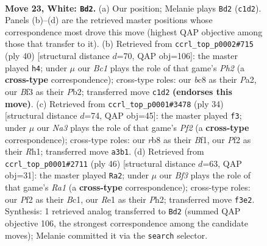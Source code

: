 \documentclass[11pt]{article}
\begin{document}
\clearpage

\begin{figure}[p]\centering
\begin{subfigure}{0.46\textwidth}\centering
\resizebox{\linewidth}{!}{%
\newchessgame
\chessboard[
  setfen={1rb2r2/p3np1k/1p2pnpp/2P5/1RP5/N3PB1P/P4PP1/2B1R1K1 w - - 4 23},
  showmover=false,
  pgfstyle=straightmove, color=movearrow, markmove={c1-d2}
]}
\caption{}
\end{subfigure}\hfill
\begin{subfigure}{0.46\textwidth}\centering
\resizebox{\linewidth}{!}{%
\newchessgame
\chessboard[
  setfen={r1br2k1/5pp1/2p1pn1p/p2p4/N3P1P1/5P2/PPPRB2P/2K2R2 w - - 0 21},
  showmover=false,
  pgfstyle=straightmove, color=movearrow, markmove={h2-h4}
]}
\caption{}
\end{subfigure}
\\[4pt]
\begin{subfigure}{0.46\textwidth}\centering
\resizebox{\linewidth}{!}{%
\newchessgame
\chessboard[
  setfen={r3kb1r/1p4p1/p3pp2/3n3p/2NBb2P/2P5/PP3PP1/R3KB1R w KQkq - 0 18},
  showmover=false,
  pgfstyle=straightmove, color=movearrow, markmove={f2-f3}
]}
\caption{}
\end{subfigure}\hfill
\begin{subfigure}{0.46\textwidth}\centering
\resizebox{\linewidth}{!}{%
\newchessgame
\chessboard[
  setfen={r4bk1/pp1r1p1p/2p1pnp1/8/2BP1PP1/PP2PK2/7P/R1BR4 w - - 0 24},
  showmover=false,
  pgfstyle=straightmove, color=movearrow, markmove={a1-a2}
]}
\caption{}
\end{subfigure}
\caption{\textbf{Move 23, White: \texttt{Bd2}.} (a) Our position; Melanie plays \texttt{Bd2} (\texttt{c1d2}). Panels (b)--(d) are the retrieved master positions whose correspondence most drove this move (highest QAP objective among those that transfer to it). (b) Retrieved from \texttt{ccrl\_top\_p0002\#715} (ply 40) [structural distance $d$=70, QAP obj=106]: the master played \texttt{h4}; under $\mu$ our \emph{Bc1} plays the role of that game's \emph{Ph2} (a \textbf{cross-type} correspondence); cross-type roles: our \emph{b}c8 as their \emph{P}a2, our \emph{B}f3 as their \emph{P}b2; transferred move \texttt{c1d2} \textbf{(endorses this move)}. (c) Retrieved from \texttt{ccrl\_top\_p0001\#3478} (ply 34) [structural distance $d$=74, QAP obj=45]: the master played \texttt{f3}; under $\mu$ our \emph{Na3} plays the role of that game's \emph{Pf2} (a \textbf{cross-type} correspondence); cross-type roles: our \emph{r}b8 as their \emph{B}f1, our \emph{P}f2 as their \emph{R}h1; transferred move \texttt{a3b1}. (d) Retrieved from \texttt{ccrl\_top\_p0001\#2711} (ply 46) [structural distance $d$=63, QAP obj=31]: the master played \texttt{Ra2}; under $\mu$ our \emph{Bf3} plays the role of that game's \emph{Ra1} (a \textbf{cross-type} correspondence); cross-type roles: our \emph{P}f2 as their \emph{B}c1, our \emph{R}e1 as their \emph{P}h2; transferred move \texttt{f3e2}. Synthesis: 1 retrieved analog transferred to \texttt{Bd2} (summed QAP objective 106, the strongest correspondence among the candidate moves); Melanie committed it via the \texttt{search} selector.}
\label{fig:thought-m44}
\end{figure}
\end{document}
